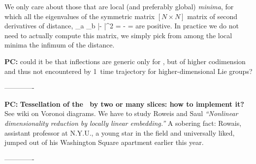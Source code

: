 We only care about those that are local (and preferably global) {\em
minima}, for which all the eigenvalues of the symmetric matrix
$[N\!\times\!N]$ matrix of second derivatives of distance,
\beq
{}
     {\partial \gSpace_a \partial \gSpace_b}
        |\sspRed - \slicep|^2
    =
  - =
are positive. In practice we do not need to actually compute
this matrix, we simply pick from among the local minima
the infimum of the distance.

{\bf PC:}{ could it be that inflections are generic only for ,
        but of higher codimension and thus not encountered
        by 1\dmn\ time trajectory for higher-dimensional Lie groups?}


-------------

{\bf PC:}{
{\bf Tessellation of the \reducedsp\ by two or many slices:
how to implement it?}
See 
{wiki on Voronoi diagrams}.
We have to study Roweis  and Saul
\emph{``Nonlinear dimensionality reduction by locally linear embedding.''}
A sobering fact: Rowais, assistant professor at N.Y.U., a young
star in the field and universally liked, jumped out of his Washington
Square apartment earlier this year.
	}


%

-------------

